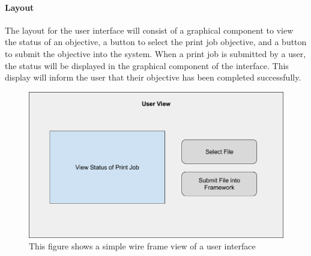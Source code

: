 \documentclass[draftclsnofoot, onecolumn, compsoc, 10pt]{IEEEtran}
\begin{document}
\paragraph{Layout}
The layout for the user interface will consist of a graphical component to view the status of an objective, a button to select the print job objective, and a button to submit the objective into the system. When a print job is submitted by a user, the status will be displayed in the graphical component of the interface. This display will inform the user that their objective has been completed successfully. 
\begin{figure}[H]
\centering
\includegraphics[scale=0.4]{user}
\captionsetup{justification=centering}
\caption{This figure shows a simple wire frame view of a user interface}
\end{figure}
\end{document}
